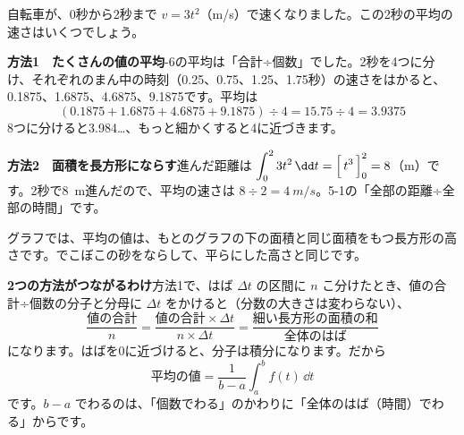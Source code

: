 
\label{bk:5-12:heikin}自転車が、0秒から2秒まで $v=3t^2$（m/s）で速くなりました。この2秒の平均の速さはいくつでしょう。

\noindent\textbf{方法1　たくさんの値の平均}-6の平均は「合計÷個数」でした。2秒を4つに分け、それぞれのまん中の時刻（0.25、0.75、1.25、1.75秒）の速さをはかると、0.1875、1.6875、4.6875、9.1875です。平均は
\[ (0.1875+1.6875+4.6875+9.1875)\div4=15.75\div4=3.9375 \]
8つに分けると3.984…、もっと細かくすると4に近づきます。

\noindent\textbf{方法2　面積を長方形にならす}\quad 進んだ距離は $\displaystyle\int_0^2 3t^2\,\dd t=\Bigl[\,t^3\,\Bigr]_0^2=8$（m）です。2秒で\qty{8}{m}進んだので、平均の速さは $8\div2=\qty{4}{m/s}$。5-1の「全部の距離÷全部の時間」です。

\noindent\begin{minipage}[c]{0.53\linewidth}\centering
{}
\end{minipage}\hfill
\begin{minipage}[c]{0.44\linewidth}\raggedright
グラフでは、平均の値は、もとのグラフの下の面積と同じ面積をもつ長方形の高さです。でこぼこの砂をならして、平らにした高さと同じです。
\end{minipage}

\noindent\textbf{2つの方法がつながるわけ}\quad 方法1で、はば $\Delta t$ の区間に $n$ こ分けたとき、値の合計÷個数の分子と分母に $\Delta t$ をかけると（分数の大きさは変わらない）、
\[ \frac{\text{値の合計}}{n}=\frac{\text{値の合計}\times\Delta t}{n\times\Delta t}=\frac{\text{細い長方形の面積の和}}{\text{全体のはば}} \]
になります。はばを0に近づけると、分子は積分になります。だから
\[ \text{平均の値}=\frac{1}{b-a}\int_a^b f(t)\,\dd t \]
です。$b-a$ でわるのは、「個数でわる」のかわりに「全体のはば（時間）でわる」からです。

